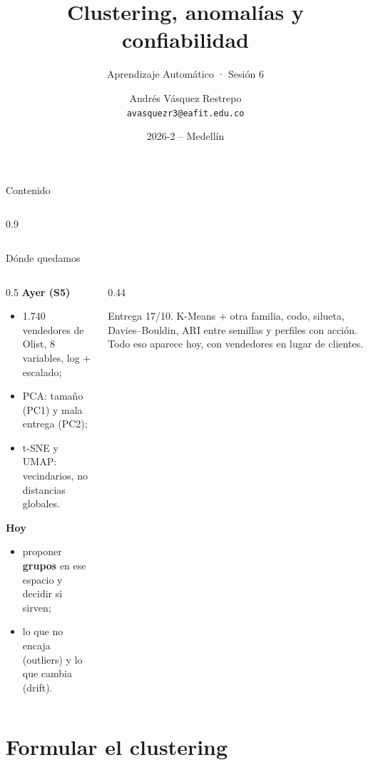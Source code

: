 \documentclass[aspectratio=169,12pt]{beamer}
\title[Clustering, anomalías y confiabilidad]{Clustering, anomalías y confiabilidad}
\subtitle{Aprendizaje Automático · Sesión 6}
\author[Aprendizaje Automático]{Andrés Vásquez Restrepo\\[2pt]{\normalfont\small\texttt{avasquezr3@eafit.edu.co}}}
\institute{SI7009 - 1 (5553)\\Universidad EAFIT}
\date{2026-2 -- Medellín}
\newcommand{\colhead}[1]{\textbf{#1}\par\vspace{2pt}}
\begin{document}
\titleframe
\addtocounter{framenumber}{1}

\begin{frame}{Contenido}
  \begin{columns}[T]
    \begin{column}{0.9\textwidth}
      \small\tableofcontents
    \end{column}
  \end{columns}
\end{frame}

\begin{frame}{Dónde quedamos}
  \begin{columns}[T]
    \begin{column}{0.5\textwidth}
      \colhead{Ayer (S5)}
      \footnotesize
      \begin{itemize}
        \item 1.740 vendedores de Olist, 8 variables, log + escalado;
        \item PCA: tamaño (PC1) y mala entrega (PC2);
        \item t-SNE y UMAP: vecindarios, no distancias globales.
      \end{itemize}
      \vspace{4pt}
      \colhead{Hoy}
      \begin{itemize}
        \item proponer \textbf{grupos} en ese espacio y decidir si sirven;
        \item lo que no encaja (outliers) y lo que cambia (drift).
      \end{itemize}
    \end{column}
    \begin{column}{0.44\textwidth}
      \begin{keybox}
        \small Entrega 17/10. K-Means + otra familia, codo, silueta, Davies--Bouldin, ARI entre semillas y perfiles con acción. Todo eso aparece hoy, con vendedores en lugar de clientes.
      \end{keybox}
    \end{column}
  \end{columns}
\end{frame}

\section{Formular el clustering}
\end{document}
